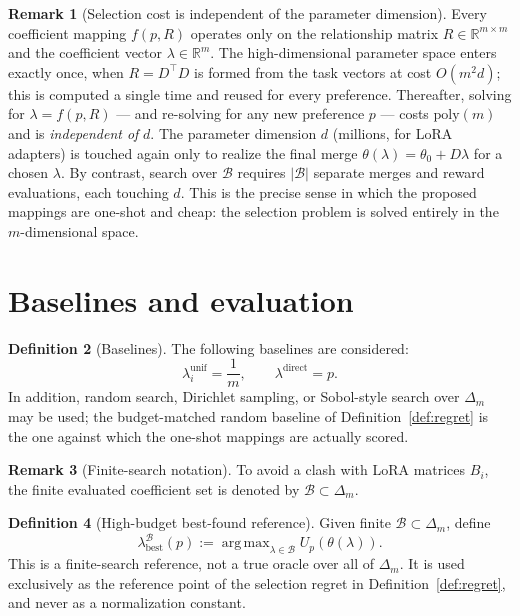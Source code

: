 \documentclass[12pt,a4paper]{report}
\newcommand{\R}{\mathbb{R}}
\newcommand{\1}{\mathbf{1}}
\newcommand{\Bset}{\mathcal{B}}
\DeclareMathOperator*{\argmax}{arg\,max}
\theoremstyle{definition}
\newtheorem{definition}{Definition}
\newtheorem{remark}[definition]{Remark}
\begin{document}
\begin{remark}[Selection cost is independent of the parameter dimension]
\label{rem:selection-cost}
Every coefficient mapping \(f(p,R)\) operates only on the relationship matrix \(R\in\R^{m\times m}\) and the coefficient vector \(\lambda\in\R^m\). The high-dimensional parameter space enters exactly once, when \(R=D^\top D\) is formed from the task vectors at cost \(O(m^2 d)\); this is computed a single time and reused for every preference. Thereafter, solving for \(\lambda=f(p,R)\) --- and re-solving for any new preference \(p\) --- costs \(\mathrm{poly}(m)\) and is \emph{independent of} \(d\). The parameter dimension \(d\) (millions, for LoRA adapters) is touched again only to realize the final merge \(\theta(\lambda)=\theta_0+D\lambda\) for a chosen \(\lambda\). By contrast, search over \(\Bset\) requires \(\lvert\Bset\rvert\) separate merges and reward evaluations, each touching \(d\). This is the precise sense in which the proposed mappings are one-shot and cheap: the selection problem is solved entirely in the \(m\)-dimensional space.
\end{remark}

\section{Baselines and evaluation}
\label{sec:metrics}

\begin{definition}[Baselines]
\label{def:baselines}
The following baselines are considered:
\[
\lambda_i^{\mathrm{unif}}=\frac{1}{m},\qquad
\lambda^{\mathrm{direct}}=p.
\]
In addition, random search, Dirichlet sampling, or Sobol-style search over \(\Delta_m\) may be used; the budget-matched random baseline of Definition~\ref{def:regret} is the one against which the one-shot mappings are actually scored.
\end{definition}

\begin{remark}[Finite-search notation]
\label{rem:b-notation}
To avoid a clash with LoRA matrices \(B_i\), the finite evaluated coefficient set is denoted by \(\Bset\subset\Delta_m\).
\end{remark}

\begin{definition}[High-budget best-found reference]
\label{def:best-found}
Given finite \(\Bset\subset\Delta_m\), define
\[
\lambda_{\mathrm{best}}^{\Bset}(p):=\argmax_{\lambda\in\Bset}U_p(\theta(\lambda)).
\]
This is a finite-search reference, not a true oracle over all of \(\Delta_m\). It is used exclusively as the reference point of the selection regret in Definition~\ref{def:regret}, and never as a normalization constant.
\end{definition}
\end{document}
